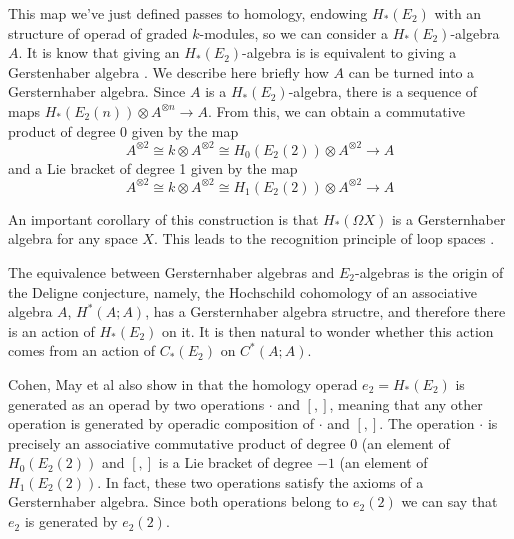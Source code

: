 \documentclass[TFM.tex]{subfiles}
\begin{document}
This map we've just defined passes to homology, endowing $H_*(E_2)$ with an structure of operad of graded $k$-modules, so we can consider a $H_*(E_2)$-algebra $A$. It is know that giving an $H_*(E_2)$-algebra is is equivalent to giving a Gerstenhaber algebra \cite{cuentas}. We describe here briefly how $A$ can be turned into a Gersternhaber algebra. Since $A$ is a $H_*(E_2)$-algebra, there is a sequence of maps $H_*(E_2(n))\otimes A^{\otimes n}\to A$. From this, we can obtain a commutative product of degree 0 given by the map
\[
A^{\otimes 2}\cong k\otimes A^{\otimes 2}\cong H_0(E_2(2))\otimes A^{\otimes 2}\to A
\]
and a Lie bracket of degree 1 given by the map
\[
A^{\otimes 2}\cong k\otimes A^{\otimes 2}\cong H_1(E_2(2))\otimes A^{\otimes 2}\to A
\]

An important corollary of this construction is that $H_*(\Omega X)$ is a Gersternhaber algebra for any space $X$. This leads to the recognition principle of loop spaces \cite{May}.

The equivalence between Gersternhaber algebras and $E_2$-algebras is the origin of the Deligne conjecture, namely, the Hochschild cohomology of an associative algebra $A$, $H^*(A;A)$, has a Gersternhaber algebra structre, and therefore there is an action of $H_*(E_2)$ on it. It is then natural to wonder whether this action comes from an action of $C_*(E_2)$ on $C^*(A;A)$. 

Cohen, May et al also show in \cite{cuentas} that the homology operad $e_2=H_*(E_2)$ is generated as an operad by two operations $\cdot$ and $[,]$, meaning that any other operation is generated by operadic composition of $\cdot$ and $[,]$. The operation $\cdot$ is precisely an associative commutative product of degree 0 (an element of $H_0(E_2(2))$ and $[,]$ is a Lie bracket of degree $-1$ (an element of $H_1(E_2(2))$. In fact, these two operations satisfy the axioms of a Gersternhaber algebra. Since both operations belong to $e_2(2)$ we can say that $e_2$ is generated by $e_2(2)$.


\end{document}
